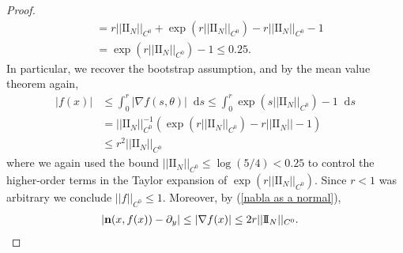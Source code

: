 \documentclass[reqno,11pt]{amsart}
\newcommand*\dif{\mathop{}\!\mathrm{d}}
\newcommand{\Two}{\mathrm{I\!I}}
\newcommand{\normal}{\mathbf n}
\theoremstyle{definition}
\numberwithin{equation}{section}
\begin{document}
\begin{proof}
\begin{align*}
	&= r ||\Two_N||_{C^0} + \exp(r ||\Two_N||_{C^0}) - r ||\Two_N||_{C^0} - 1 \\
	&= \exp(r ||\Two_N||_{C^0}) - 1 \leq 0.25.
\end{align*}
	In particular, we recover the bootstrap assumption, and by the mean value theorem again,
\begin{align*}
	|f(x)| &\leq \int_0^r |\nabla f(s, \theta)| \dif s \leq \int_0^r \exp(s ||\Two_N||_{C^0}) - 1 \dif s \\
	&= ||\Two_N||_{C^0}^{-1} (\exp(r ||\Two_N||_{C^0}) - r||\Two_N|| - 1) \\
	&\leq r^2 ||\Two_N||_{C^0}
\end{align*}
	where we again used the bound $||\Two_N||_{C^0} \leq \log(5/4) < 0.25$ to control the higher-order terms in the Taylor expansion of $\exp(r ||\Two_N||_{C^0})$. Since $r < 1$ was arbitrary we conclude $||f||_{C^0} \leq 1$. Moreover, by (\ref{nabla as a normal}),
\begin{align*}
	|\normal(x, f(x)) - \partial_y| &\leq |\nabla f(x)| \leq 2r ||\Two_N||_{C^0}. \qedhere
\end{align*}
\end{proof}
\end{document}
